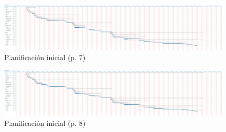\begin{figure}
 \centering
 \includegraphics[trim=189cm 5cm 21cm 0,clip=true,scale=0.45,keepaspectratio=true]{./imagenes/planificacion-inicial.png}
 \caption{Planificación inicial (p. 7)}
 \label{figura:PlanificacionInicialCompleta7}
\end{figure}

\begin{figure}
 \centering
 \includegraphics[trim=221cm 5cm 0 0,clip=true,scale=0.45,keepaspectratio=true]{./imagenes/planificacion-inicial.png}
 \caption{Planificación inicial (p. 8)}
 \label{figura:PlanificacionInicialCompleta8}
\end{figure}